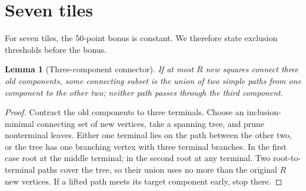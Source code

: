 \documentclass{article}
\theoremstyle{plain}
\newtheorem{lemma}[theorem]{Lemma}
\begin{document}
\section{Seven tiles}

For seven tiles, the 50-point bonus is constant. We therefore state exclusion
thresholds before the bonus.

\begin{lemma}[Three-component connector]\label{lem:connector}
If at most $R$ new squares connect three old components, some connecting subset
is the union of two simple paths from one component to the other two; neither
path passes through the third component.
\end{lemma}
\begin{proof}
Contract the old components to three terminals. Choose an inclusion-minimal
connecting set of new vertices, take a spanning tree, and prune nonterminal
leaves. Either one terminal lies on the path between the other two, or the tree
has one branching vertex with three terminal branches. In the first case root
at the middle terminal; in the second root at any terminal. Two root-to-terminal
paths cover the tree, so their union uses no more than the original $R$ new
vertices. If a lifted path meets its target component early, stop there.
\end{proof}
\end{document}
